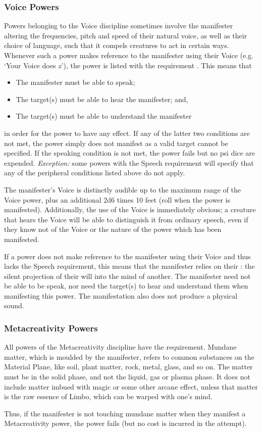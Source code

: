 \subsubsection{Voice Powers}
\label{subs:voice_powers}
Powers belonging to the Voice discipline sometimes involve
the manifester altering the frequencies, pitch and
speed of their natural voice, as well as their choice
of language, such that it compels
creatures to act in certain ways.
Whenever such a power makes reference to the manifester
using their Voice (e.g. `Your Voice does \textit{x}'),
the power is listed with the requirement .
This means that
\begin{itemize}
    \item The manifester must be able to speak;
    \item The target(s) must be able to hear the manifester; and,
    \item The target(s) must be able to understand the manifester
\end{itemize}
in order for the power to have any effect.
If any of the latter two conditions are not met,
the power simply does not manifest as a valid target
cannot be specified.
If the speaking condition is not met,
the power fails but no psi dice are expended.
\textit{Exception:} some powers with the Speech requirement
will specify that any of the peripheral conditions listed above
do not apply.

The manifester's Voice is distinctly audible
up to the maximum range of the Voice power,
plus an additional 2d6 times 10 feet
(roll when the power is manifested).
Additionally, the use of the Voice is immediately obvious;
a creature that hears the Voice will be able to distinguish
it from ordinary speech,
even if they know not of the Voice or
the nature of the power which has been manifested.

If a power does not make reference to the manifester
using their Voice and thus lacks the Speech requirement,
this means that the manifester relies on their
: the silent projection of their will
into the mind of another.
The manifester need not be able to be speak,
nor need the target(s) to hear and understand them
when manifesting this power.
The manifestation also does not produce a physical sound.

\subsubsection{Metacreativity Powers}
All powers of the Metacreativity discipline have the
 requirement.
Mundane matter, which is moulded by the manifester,
refers to common substances on the
Material Plane,
like soil, plant matter, rock, metal,
glass, and so on.
The matter must be in the solid phase,
and not the liquid, gas or plasma phase.
It does not include matter imbued with magic
or some other arcane effect,
unless that matter is the raw essence of Limbo,
which can be warped with one's mind.

Thus,
if the manifester is not touching mundane matter
when they manifest a Metacreativity power,
the power fails (but no cost is incurred in the attempt).

